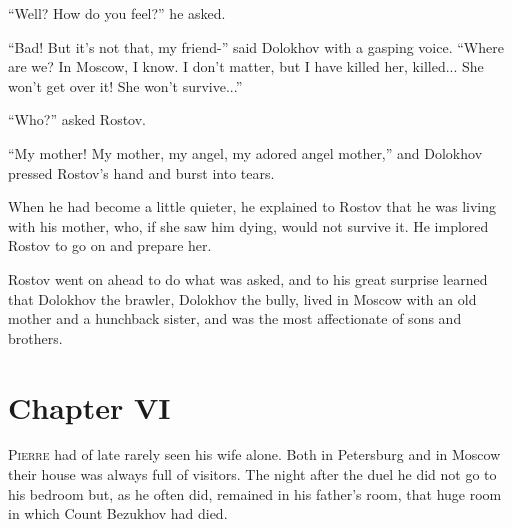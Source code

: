 ``Well? How do you feel?'' he asked.

``Bad! But it's not that, my friend-'' said Dolokhov with a
gasping voice.  ``Where are we? In Moscow, I know. I don't
matter, but I have killed her, killed... She won't get over it!
She won't survive...''

``Who?'' asked Rostov.

``My mother! My mother, my angel, my adored angel mother,'' and
Dolokhov pressed Rostov's hand and burst into tears.

When he had become a little quieter, he explained to Rostov that
he was living with his mother, who, if she saw him dying, would
not survive it.  He implored Rostov to go on and prepare her.

Rostov went on ahead to do what was asked, and to his great
surprise learned that Dolokhov the brawler, Dolokhov the bully,
lived in Moscow with an old mother and a hunchback sister, and
was the most affectionate of sons and brothers.


\chapter*{Chapter VI}
\ifaudio     
{} 
\fi

\lettrine[lines=2, loversize=0.3, lraise=0]{\initfamily P}{ierre}
had of late rarely seen his wife alone. Both in Petersburg
and in Moscow their house was always full of visitors. The night
after the duel he did not go to his bedroom but, as he often did,
remained in his father's room, that huge room in which Count
Bezukhov had died.

